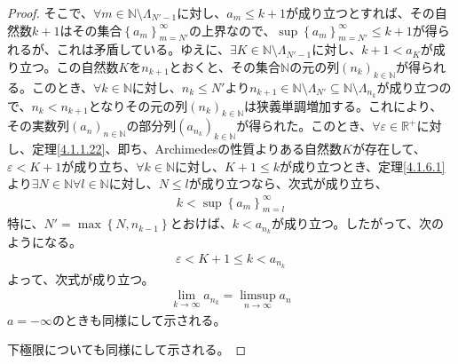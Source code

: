 \documentclass[dvipdfmx]{jsarticle}
\begin{document}
\begin{proof}
そこで、$\forall m \in \mathbb{N} \setminus \varLambda_{N' - 1}$に対し、$a_{m} \leq k + 1$が成り立つとすれば、その自然数$k + 1$はその集合$\left\{ a_{m} \right\}_{m = N'}^{\infty}$の上界なので、$\sup\left\{ a_{m} \right\}_{m = N'}^{\infty} \leq k + 1$が得られるが、これは矛盾している。ゆえに、$\exists K \in \mathbb{N} \setminus \varLambda_{N' - 1}$に対し、$k + 1 < a_{K}$が成り立つ。この自然数$K$を$n_{k + 1}$とおくと、その集合$\mathbb{N}$の元の列$\left( n_{k} \right)_{k \in \mathbb{N}}$が得られる。このとき、$\forall k \in \mathbb{N}$に対し、$n_{k} \leq N'$より$n_{k + 1} \in \mathbb{N} \setminus \varLambda_{N'} \subseteq \mathbb{N} \setminus \varLambda_{n_{k}}$が成り立つので、$n_{k} < n_{k + 1}$となりその元の列$\left( n_{k} \right)_{k \in \mathbb{N}}$は狭義単調増加する。これにより、その実数列$\left( a_{n} \right)_{n \in \mathbb{N}}$の部分列$\left( a_{n_{k}} \right)_{k \in \mathbb{N}}$が得られた。このとき、$\forall\varepsilon \in \mathbb{R}^{+}$に対し、定理\ref{4.1.1.22}、即ち、Archimedesの性質よりある自然数$K$が存在して、$\varepsilon < K + 1$が成り立ち、$\forall k \in \mathbb{N}$に対し、$K + 1 \leq k$が成り立つとき、定理\ref{4.1.6.1}より$\exists N \in \mathbb{N}\forall l \in \mathbb{N}$に対し、$N \leq l$が成り立つなら、次式が成り立ち、
\begin{align*}
k < \sup\left\{ a_{m} \right\}_{m = l}^{\infty}
\end{align*}
特に、$N' = \max\left\{ N,n_{k - 1} \right\}$とおけば、$k < a_{n_{k}}$が成り立つ。したがって、次のようになる。
\begin{align*}
\varepsilon < K + 1 \leq k < a_{n_{k}}
\end{align*}
よって、次式が成り立つ。
\begin{align*}
\lim_{k \rightarrow \infty}a_{n_{k}} = \limsup_{n \rightarrow \infty}a_{n}
\end{align*}
$a = - \infty$のときも同様にして示される。\par
下極限についても同様にして示される。
\end{proof}
\end{document}
